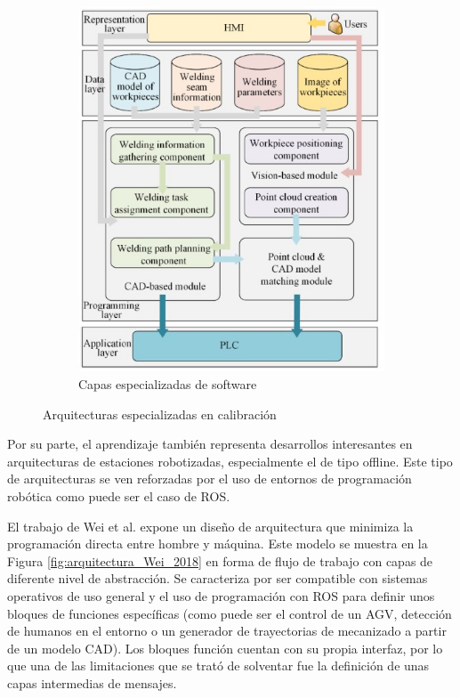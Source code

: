 \begin{figure}[h!]
\begin{subfigure}[h]{0.45\linewidth}
            \includegraphics[scale=0.25]{figuras/arquitectura_zheng_capas.jpg}
            \caption{Capas especializadas de software \cite{Zheng_2022}}
            \label{fig:arquitectura_zheng_capas}
        \end{subfigure}
        \caption{Arquitecturas especializadas en calibración}
    \end{figure}

Por su parte, el aprendizaje también representa desarrollos interesantes en arquitecturas de estaciones robotizadas, especialmente el de tipo offline. Este tipo de arquitecturas se ven reforzadas por el uso de entornos de programación robótica como puede ser el caso de \acrshort{ROS}. 

El trabajo de Wei et al.\cite{Wei_2018} expone un diseño de arquitectura que minimiza la programación directa entre hombre y máquina. Este modelo se muestra en la Figura \ref{fig:arquitectura_Wei_2018} en forma de flujo de trabajo con capas de diferente nivel de abstracción. Se caracteriza por ser compatible con sistemas operativos de uso general y el uso de programación con \acrshort{ROS} para definir unos bloques de funciones específicas (como puede ser el control de un AGV, detección de humanos en el entorno o un generador de trayectorias de mecanizado a partir de un modelo \acrshort{CAD}). Los bloques función cuentan con su propia interfaz, por lo que una de las limitaciones que se trató de solventar fue la definición de unas capas intermedias de mensajes.

